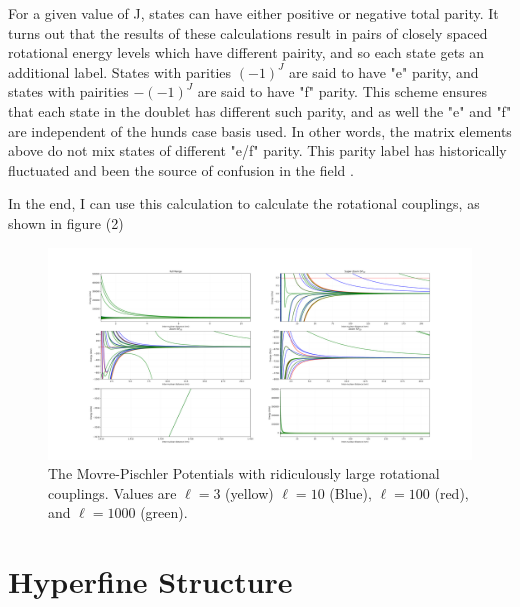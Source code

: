 \documentclass[prl, longbibliography]{revtex4-2}
\begin{document}
For a given value of J, states can have either positive or negative total parity. It turns out that the results of these calculations result in pairs of closely spaced rotational energy levels which have different pairity, and so each state gets an additional label. States with parities $(-1)^J$ are said to have "e" parity, and states with pairities $-(-1)^J$ are said to have "f" parity. This scheme ensures that each state in the doublet has different such parity, and as well the "e" and "f" are independent of the hunds case basis used. In other words, the matrix elements above do not mix states of different "e/f" parity. This parity label has historically fluctuated and been the source of confusion in the field \cite{hornkohl_parity_2017,brown_labeling_1975}.

In the end, I can use this calculation to calculate the rotational couplings, as shown in figure (2)
\begin{figure}
  \centering
    \includegraphics[width=\textwidth]{Movre-Pischler-Super-Rotating}
    \caption{The Movre-Pischler Potentials with ridiculously large rotational couplings. Values are $\ell=3$ (yellow) $\ell=10$ (Blue), $\ell=100$ (red), and $\ell=1000$ (green). }
\end{figure}

\section{Hyperfine Structure} 
\end{document}
